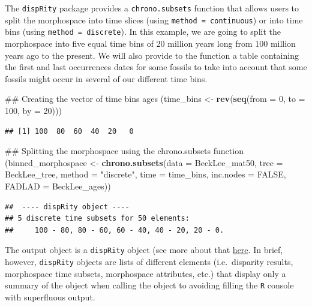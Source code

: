 \documentclass[]{book}
\newenvironment{Shaded}{\begin{snugshade}}{\end{snugshade}}
\newcommand{\KeywordTok}[1]{\textcolor[rgb]{0.13,0.29,0.53}{\textbf{#1}}}
\newcommand{\DataTypeTok}[1]{\textcolor[rgb]{0.13,0.29,0.53}{#1}}
\newcommand{\DecValTok}[1]{\textcolor[rgb]{0.00,0.00,0.81}{#1}}
\newcommand{\StringTok}[1]{\textcolor[rgb]{0.31,0.60,0.02}{#1}}
\newcommand{\OtherTok}[1]{\textcolor[rgb]{0.56,0.35,0.01}{#1}}
\newcommand{\NormalTok}[1]{#1}
\theoremstyle{definition}
\theoremstyle{definition}
\theoremstyle{definition}
\theoremstyle{remark}
\begin{document}
The \texttt{dispRity} package provides a \texttt{chrono.subsets}
function that allows users to split the morphospace into time slices
(using \texttt{method\ =\ continuous}) or into time bins (using
\texttt{method\ =\ discrete}). In this example, we are going to split
the morphospace into five equal time bins of 20 million years long from
100 million years ago to the present. We will also provide to the
function a table containing the first and last occurrences dates for
some fossils to take into account that some fossils might occur in
several of our different time bins.

\begin{Shaded}
\begin{Highlighting}[]
\NormalTok{## Creating the vector of time bins ages}
\NormalTok{(time_bins <-}\StringTok{ }\KeywordTok{rev}\NormalTok{(}\KeywordTok{seq}\NormalTok{(}\DataTypeTok{from =} \DecValTok{0}\NormalTok{, }\DataTypeTok{to =} \DecValTok{100}\NormalTok{, }\DataTypeTok{by =} \DecValTok{20}\NormalTok{)))}
\end{Highlighting}
\end{Shaded}

\begin{verbatim}
## [1] 100  80  60  40  20   0
\end{verbatim}

\begin{Shaded}
\begin{Highlighting}[]
\NormalTok{## Splitting the morphospace using the chrono.subsets function}
\NormalTok{(binned_morphospace <-}\StringTok{ }\KeywordTok{chrono.subsets}\NormalTok{(}\DataTypeTok{data =}\NormalTok{ BeckLee_mat50, }\DataTypeTok{tree =}\NormalTok{ BeckLee_tree,}
    \DataTypeTok{method =} \StringTok{"discrete"}\NormalTok{, }\DataTypeTok{time =}\NormalTok{ time_bins, }\DataTypeTok{inc.nodes =} \OtherTok{FALSE}\NormalTok{,}
    \DataTypeTok{FADLAD =}\NormalTok{ BeckLee_ages))}
\end{Highlighting}
\end{Shaded}

\begin{verbatim}
##  ---- dispRity object ---- 
## 5 discrete time subsets for 50 elements:
##     100 - 80, 80 - 60, 60 - 40, 40 - 20, 20 - 0.
\end{verbatim}

The output object is a \texttt{dispRity} object (see more about that
\protect\hyperlink{The-guts-of-the-dispRity-package}{here}. In brief,
however, \texttt{dispRity} objects are lists of different elements
(i.e.~disparity results, morphospace time subsets, morphospace
attributes, etc.) that display only a summary of the object when calling
the object to avoiding filling the \texttt{R} console with superfluous
output.
\end{document}
